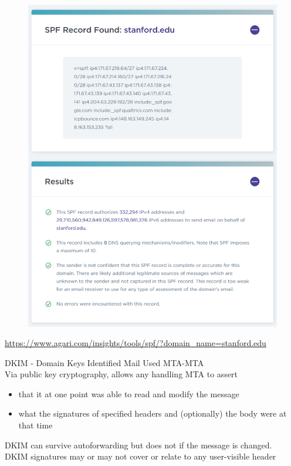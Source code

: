 \documentclass[nobackground,dvipsnames,table]{beamer}
\begin{document}
\begin{frame}{}
    \thispagestyle{empty}
    \begin{figure}
        \centering
        \includegraphics[height=\textheight]{spf-found}
    \end{figure}
    \url{https://www.agari.com/insights/tools/spf/?domain_name=stanford.edu}
\end{frame}

\begin{frame}{DKIM - Domain Keys Identified Mail}
    Used MTA-MTA\\
    Via public key cryptography, allows any handling MTA to assert
    \begin{itemize}
        \item that it at one point was able to read and modify the message
        \item what the signatures of specified headers and (optionally) the body were at that time
    \end{itemize}
    DKIM can survive autoforwarding but does not if the message is changed.\\
    DKIM signatures may or may not cover or relate to any user-visible header
\end{frame}
\end{document}
